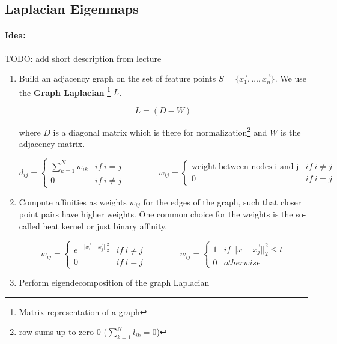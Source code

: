 
\subsection*{Laplacian Eigenmaps}

\paragraph{Idea:} TODO: add short description from lecture

\begin{enumerate}
    \item Build an adjacency graph on the set of feature points \(S=\{\vec{x_1}, \dots, \vec{x_n}\}\). We use the \textbf{Graph Laplacian} \footnote{Matrix representation of a graph} $L$.

      \[L = (D - W)\]

      where \(D\) is a diagonal matrix which is there for normalization\footnote{row sums up to zero \(0\) (\(\sum_{k=1}^N l_{ik} = 0\))} and \(W\) is the adjacency matrix.

      \[d_{ij} = \begin{cases} \sum_{k=1}^N w_{ik} & if \ i=j \\ 0 & if \ i \neq j \end{cases}
        \qquad \qquad w_{ij} = \begin{cases} \text{weight between nodes i and j} & if \ i\neq j \\ 0 & if \ i = j\end{cases}\]

    \item Compute affinities as weights \(w_{ij}\) for the edges of the graph, such that closer point pairs have higher weights. One common choice for the weights is the so-called heat kernel or just binary affinity.

      \[w_{ij} = \begin{cases} e^{-||\vec{x_i} - \vec{x_j}||_2^2}  & if \ i\neq j \\ 0 & if \ i = j\end{cases}
        \qquad \qquad w_{ij} = \begin{cases} 1 & if \ ||x-\vec{x_j}||_2^2 \leq t \\ 0 & otherwise \end{cases}\]

    \item Perform eigendecomposition of the graph Laplacian


\end{enumerate}
